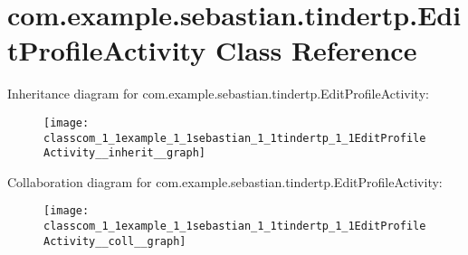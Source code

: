 \hypertarget{classcom_1_1example_1_1sebastian_1_1tindertp_1_1EditProfileActivity}{}\section{com.\+example.\+sebastian.\+tindertp.\+Edit\+Profile\+Activity Class Reference}
\label{classcom_1_1example_1_1sebastian_1_1tindertp_1_1EditProfileActivity}


Inheritance diagram for com.\+example.\+sebastian.\+tindertp.\+Edit\+Profile\+Activity\+:\nopagebreak
\begin{figure}[H]
\begin{center}
\leavevmode
\texttt{[image: classcom\_1\_1example\_1\_1sebastian\_1\_1tindertp\_1\_1EditProfileActivity\_\_inherit\_\_graph]}
\end{center}
\end{figure}


Collaboration diagram for com.\+example.\+sebastian.\+tindertp.\+Edit\+Profile\+Activity\+:\nopagebreak
\begin{figure}[H]
\begin{center}
\leavevmode
\texttt{[image: classcom\_1\_1example\_1\_1sebastian\_1\_1tindertp\_1\_1EditProfileActivity\_\_coll\_\_graph]}
\end{center}
\end{figure}
